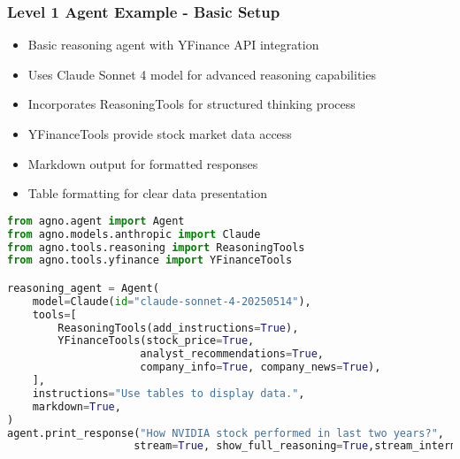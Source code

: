       
\begin{frame}[fragile]\frametitle{Level 1 Agent Example - Basic Setup}
      \begin{itemize}
	\item Basic reasoning agent with YFinance API integration
	\item Uses Claude Sonnet 4 model for advanced reasoning capabilities
	\item Incorporates ReasoningTools for structured thinking process
	\item YFinanceTools provide stock market data access
	\item Markdown output for formatted responses
	\item Table formatting for clear data presentation
	  \end{itemize}
      
      \begin{lstlisting}[language=python, basicstyle=\tiny]
from agno.agent import Agent
from agno.models.anthropic import Claude
from agno.tools.reasoning import ReasoningTools
from agno.tools.yfinance import YFinanceTools

reasoning_agent = Agent(
    model=Claude(id="claude-sonnet-4-20250514"),
    tools=[
        ReasoningTools(add_instructions=True),
        YFinanceTools(stock_price=True, 
                     analyst_recommendations=True, 
                     company_info=True, company_news=True),
    ],
    instructions="Use tables to display data.",
    markdown=True,
)
agent.print_response("How NVIDIA stock performed in last two years?",
                    stream=True, show_full_reasoning=True,stream_intermediate_steps=True)
      \end{lstlisting}
\end{frame}

